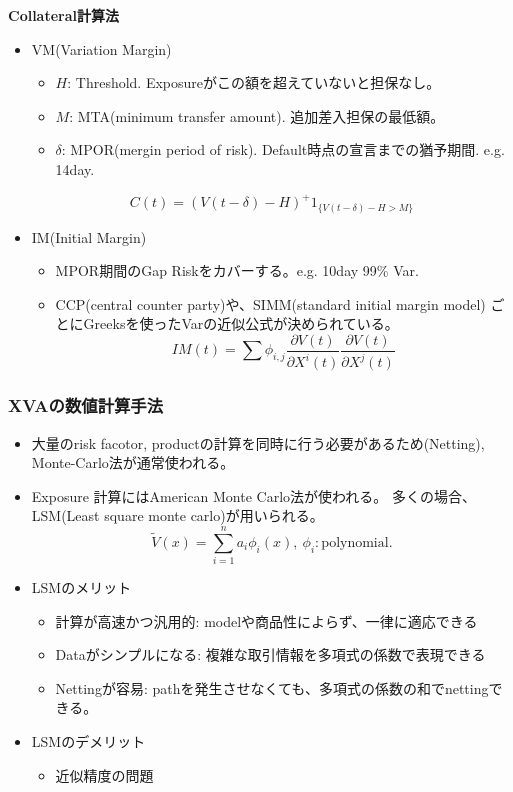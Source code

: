 \documentclass[driverfallback=dvipdfmx,cjk]{beamer}
\begin{document}
\begin{frame}
    \textbf{Collateral計算法}
    \begin{itemize}
        \item VM(Variation Margin)
            \begin{itemize}
                \item $H$: Threshold. Exposureがこの額を超えていないと担保なし。
                \item $M$: MTA(minimum transfer amount). 追加差入担保の最低額。
                \item $\delta$: MPOR(mergin period of risk). Default時点の宣言までの猶予期間. e.g. 14day.
            \end{itemize}
            $$ C(t) = \left(V(t- \delta) - H\right)^+ 1_{\{V(t-\delta)-H > M\}}$$
        \item IM(Initial Margin)
            \begin{itemize}
                \item MPOR期間のGap Riskをカバーする。e.g. 10day 99\% Var.
                \item CCP(central counter party)や、SIMM(standard initial margin model)
                    ごとにGreeksを使ったVarの近似公式が決められている。
                    $$IM(t) = \sum \phi_{i,j} \frac{\partial V(t)}{\partial X^i(t)} \frac{\partial V(t)}{\partial X^j(t)}$$
            \end{itemize}
    \end{itemize}
\end{frame}

\begin{frame} \frametitle{XVAの数値計算手法}
    \begin{itemize}
        \item 大量のrisk facotor, productの計算を同時に行う必要があるため(Netting), Monte-Carlo法が通常使われる。
        \item Exposure 計算にはAmerican Monte Carlo法が使われる。
            多くの場合、LSM(Least square monte carlo)が用いられる。
            $$ \tilde{V}(x) = \sum_{i=1}^n a_i \phi_i(x), \ \phi_i: \text{polynomial}.$$
        \item LSMのメリット
        \begin{itemize}
            \item 計算が高速かつ汎用的: modelや商品性によらず、一律に適応できる
            \item Dataがシンプルになる: 複雑な取引情報を多項式の係数で表現できる
            \item Nettingが容易: pathを発生させなくても、多項式の係数の和でnettingできる。
        \end{itemize}
    \item LSMのデメリット
        \begin{itemize}
            \item 近似精度の問題
        \end{itemize}
    \end{itemize}
\end{frame}
\end{document}
